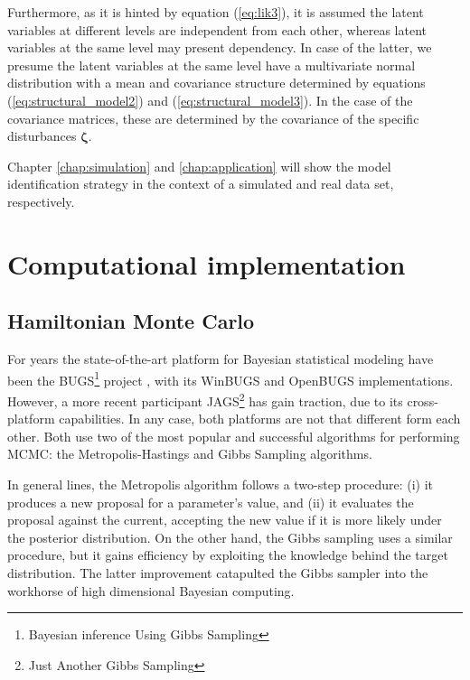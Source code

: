 Furthermore, as it is hinted by equation (\ref{eq:lik3}), it is assumed the latent variables at different levels are independent from each other, whereas latent variables at the same level may present dependency. In case of the latter, we presume the latent variables at the same level have a multivariate normal distribution with a mean and covariance structure determined by equations (\ref{eq:structural_model2}) and (\ref{eq:structural_model3}). In the case of the covariance matrices, these are determined by the covariance of the specific disturbances $\pmb{\zeta}$. 

Chapter \ref{chap:simulation} and \ref{chap:application} will show the model identification strategy in the context of a simulated and real data set, respectively.



\section{Computational implementation} \label{sect:comp_imp}

\subsection{Hamiltonian Monte Carlo} \label{sub_sect:hmc}

For years the state-of-the-art platform for Bayesian statistical modeling have been the BUGS\footnote{Bayesian inference Using Gibbs Sampling} project \cite{Lunn_et_al_2000, Lunn_et_al_2009}, with its WinBUGS and OpenBUGS implementations. However, a more recent participant JAGS\footnote{Just Another Gibbs Sampling} \cite{Plummer_2003} has gain traction, due to its cross-platform capabilities. In any case, both platforms are not that different form each other. Both use two of the most popular and successful algorithms for performing MCMC: the Metropolis-Hastings \cite{Metropolis_et_al_1953, Hastings_1970} and Gibbs Sampling \cite{Geman_et_al_1984} algorithms.

In general lines, the Metropolis algorithm follows a two-step procedure: (i) it produces a new proposal for a parameter's value, and (ii) it evaluates the proposal against the current, accepting the new value if it is more likely under the posterior distribution. On the other hand, the Gibbs sampling uses a similar procedure, but it gains efficiency by exploiting the knowledge behind the target distribution. The latter improvement catapulted the Gibbs sampler into the workhorse of high dimensional Bayesian computing. 


